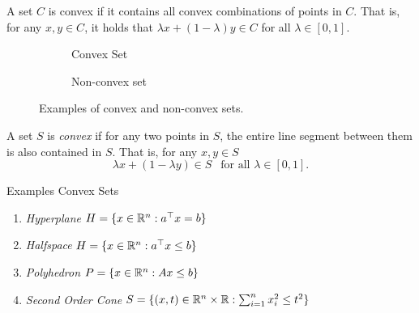 \documentclass[../open-optimization/open-optimization.tex]{subfiles}
\begin{document}
\begin{definition}
A set $C$ is convex if it contains all convex combinations of points in $C$.  That is, for any $x,y \in C$, it holds that $ \lambda x + (1-\lambda) y \in C$ for all $\lambda \in [0,1]$.
\end{definition}
\begin{figure}[h]
  \begin{subfigure}[b]{0.45\textwidth}
    \centering
    \caption{Convex Set}
    \label{a}
  \end{subfigure}
  \begin{subfigure}[b]{0.45\textwidth}
    \centering
    \caption{Non-convex set}
    \label{b}
  \end{subfigure}
\caption{Examples of convex and non-convex sets.}
\label{fig:convexity}
\end{figure}


\begin{definition}
A set $S$ is \emph{convex} if for any two points in $S$, the entire line segment between them is also contained in $S$.
That is, for any $x,y \in S$
$$
\lambda x + (1-\lambda y) \in S \ \ \text{ for all } \lambda \in [0,1].
$$
\end{definition}


    


Examples Convex Sets
\begin{enumerate}
    \item \emph{Hyperplane}  $H = \{x \in {\mathbb{R}}^n : a^\top x = b\}$
    \item \emph{Halfspace}   $H = \{ x \in {\mathbb{R}}^n : a^\top x \leq b\}$
    \item \emph{Polyhedron}  $P = \{x \in {\mathbb{R}}^n : Ax \leq b\}$
    \item \emph{Second Order Cone} $S = \{ (x,t) \in {\mathbb{R}}^n \times {\mathbb{R}} : \sum_{i=1}^n x_i^2 \leq t^2 \}$
\end{enumerate}
\end{document}
